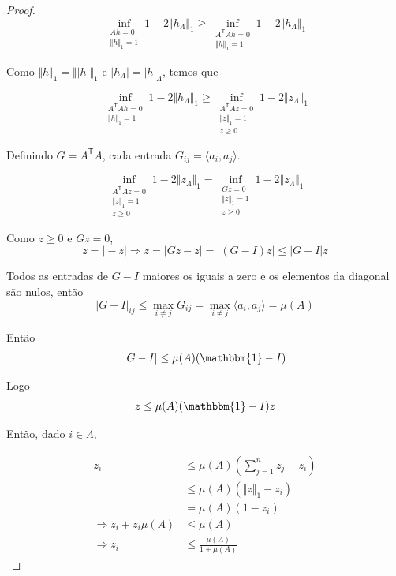 \begin{proof}
\begin{equation}
\inf_{\substack{Ah = 0 \\ \Vert h \Vert_1 = 1}} 1 - 2 \Vert h_\Lambda \Vert_1
\geq \inf_{\substack{A^{\mathsf{T}}Ah = 0 \\ \Vert h \Vert_1 = 1}} 1 - 2 \Vert h_\Lambda \Vert_1
\label{eq:thmP0P1_1}
\tag{$\ast$}
\end{equation}

Como $ \Vert h \Vert_1 = \Vert \vert h \vert \Vert_1$ e $\vert h_\Lambda \vert = \vert h \vert_\Lambda$, temos que

\begin{equation}
\inf_{\substack{A^{\mathsf{T}}Ah = 0 \\ \Vert h \Vert_1 = 1}} 1 - 2 \Vert h_\Lambda \Vert_1
\geq \inf_{\substack{A^{\mathsf{T}}Az = 0 \\ \Vert z \Vert_1 = 1 \\ z \geq 0}}
1 - 2 \Vert z_\Lambda \Vert_1
\label{eq:thmP0P1_2}
\tag{$\ast \ast$}
\end{equation}

Definindo $G = A^{\mathsf{T}}A$, cada entrada $G_{ij} = \langle a_i, a_j \rangle$.

$$\inf_{\substack{A^{\mathsf{T}}Az = 0 \\ \Vert z \Vert_1 = 1 \\ z \geq 0}}
1 - 2 \Vert z_\Lambda \Vert_1
=
\inf_{\substack{Gz = 0 \\ \Vert z \Vert_1 = 1 \\ z \geq 0}}
1 - 2 \Vert z_\Lambda \Vert_1$$

Como $z \geq 0$ e $Gz = 0$,
$$ z = \vert -z \vert \Rightarrow z = \vert Gz - z \vert
= \vert (G - I)z \vert \leq \vert G - I \vert z
$$

Todos as entradas de $G - I$ maiores os iguais a zero e os elementos da diagonal são nulos, então
$$ \vert G - I \vert_{ij} \leq \max_{i \neq j} G_{ij} = \max_{i \neq j} \langle a_i, a_j \rangle = \mu(A)$$

Então
$$ \vert G - I \vert \leq \mu(A) (\mathbbm{1} - I)$$

Logo
$$ z \leq \mu(A) (\mathbbm{1} - I) z$$

Então, dado $i \in \Lambda$,

\begin{subequations}
\begin{align*}
z_i & \leq \mu(A) \left( \sum_{j = 1}^n z_j - z_i \right) \\
& \leq \mu(A) (\Vert z \Vert_1  - z_i) \\
& = \mu(A)(1 - z_i) \\
\Rightarrow z_i + z_i\mu(A) & \leq \mu(A)\\
\Rightarrow z_i &\leq \frac{\mu(A)}{1 + \mu(A)}
\end{align*}
\end{subequations}


\end{proof}
